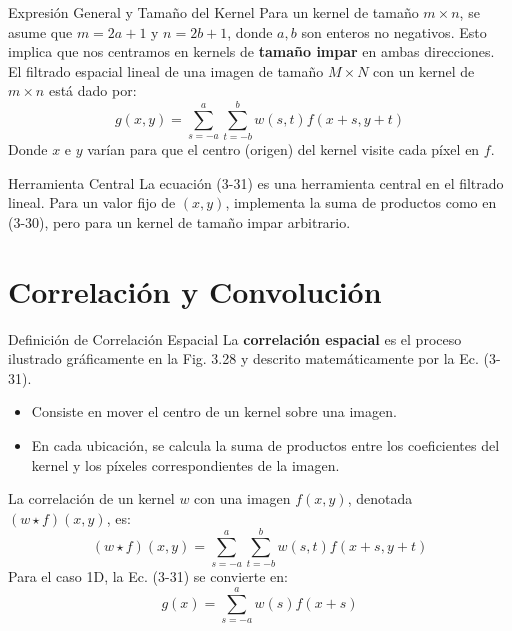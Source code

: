 \documentclass[10pt]{beamer}
\newcommand{\eqnum}[1]{\tag{#1}} %
\begin{document}
\begin{frame}[fragile]{Expresión General y Tamaño del Kernel}
Para un kernel de tamaño $m \times n$, se asume que $m = 2a+1$ y $n = 2b+1$, donde $a, b$ son enteros no negativos. Esto implica que nos centramos en kernels de \textbf{tamaño impar} en ambas direcciones.
\vspace{0.1cm}
El filtrado espacial lineal de una imagen de tamaño $M \times N$ con un kernel de $m \times n$ está dado por:
\begin{equation}
g(x,y) = \sum_{s=-a}^{a} \sum_{t=-b}^{b} w(s,t)f(x+s,y+t) \eqnum{3-31}
\end{equation}
Donde $x$ e $y$ varían para que el centro (origen) del kernel visite cada píxel en $f$.
\vspace{0.1cm}
\begin{exampleblock}{\footnotesize Herramienta Central}
{\footnotesize La ecuación (3-31) es una herramienta central en el filtrado lineal. Para un valor fijo de $(x,y)$, implementa la suma de productos como en (3-30), pero para un kernel de tamaño impar arbitrario.}
\end{exampleblock}
\end{frame}

\section{Correlación y Convolución}

\begin{frame}[fragile]{Definición de Correlación Espacial}
La \textbf{correlación espacial} es el proceso ilustrado gráficamente en la Fig. 3.28 y descrito matemáticamente por la Ec. (3-31).
{\footnotesize
\begin{itemize}
\item Consiste en mover el centro de un kernel sobre una imagen.
\item En cada ubicación, se calcula la suma de productos entre los coeficientes del kernel y los píxeles correspondientes de la imagen.
\end{itemize}
}
\vspace{0.1cm}
La correlación de un kernel $w$ con una imagen $f(x,y)$, denotada $(w \star f)(x,y)$, es:
\begin{equation}
(w \star f)(x,y) = \sum_{s=-a}^{a} \sum_{t=-b}^{b} w(s,t)f(x+s,y+t) \eqnum{3-34}
\end{equation}
\vspace{0.1cm}
Para el caso 1D, la Ec. (3-31) se convierte en:
\begin{equation}
g(x) = \sum_{s=-a}^{a} w(s)f(x+s) \eqnum{3-32}
\end{equation}
\end{frame}
\end{document}
